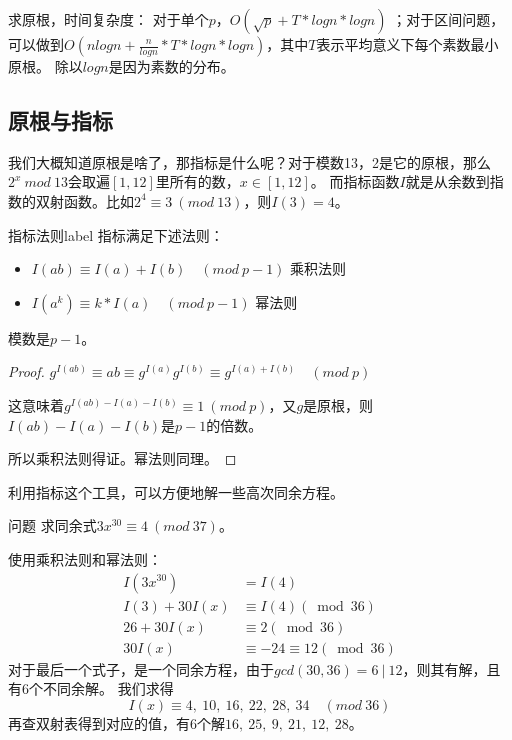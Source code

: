 \vbox{}

{\heiti 求原根，时间复杂度： 对于单个$p$，$O(\sqrt{p} + T*logn*logn)$   ；对于区间问题，可以做到$O(nlogn + \frac{n}{logn}*T*logn*logn)$，其中$T$表示平均意义下每个素数最小原根。
除以$logn$是因为素数的分布。}


\subsection{原根与指标}
我们大概知道原根是啥了，那指标是什么呢？对于模数13，2是它的原根，那么$2^x\ mod \ 13$会取遍$[1,12]$里所有的数，$x\in [1,12]$。
{\heiti 而指标函数$I$就是从余数到指数的双射函数。}比如$2^4\equiv 3\ (mod\ 13)$，则$I(3) = 4$。



\begin{theorem}{指标法则}{label}
	指标满足下述法则：
		\begin{itemize}
			\item $I(ab)\equiv I(a)+I(b) \quad (mod \ p-1)$ \quad  乘积法则
			\item $I(a^k)\equiv k*I(a)  \quad (mod \ p-1)$ \quad  幂法则
		\end{itemize}
\end{theorem}

\begin{note}
	模数是$p-1$。
\end{note}

\vbox{}

\begin{proof}
	 $g^{I(ab)}\equiv ab\equiv g^{I(a)}g^{I(b)}\equiv g^{I(a)+I(b)}\quad (mod \ p)$
	
	这意味着$g^{I(ab)-I(a)-I(b)}\equiv 1\ (mod \ p)$，又$g$是原根，则$I(ab)-I(a)-I(b)$是$p-1$的倍数。
	
	所以乘积法则得证。幂法则同理。
\end{proof}

\vbox{}

利用指标这个工具，可以方便地解一些高次同余方程。

\begin{custom}{问题}
求同余式$3x^{30}\equiv 4\ (mod \ 37)$。
\end{custom}

\begin{solution}
	使用乘积法则和幂法则：
$$
\begin{aligned} I\left(3 x^{30}\right) &=I(4) \\ I(3)+30 I(x) & \equiv I(4)(\bmod 36) \\ 26+30 I(x) &\equiv2(\bmod 36) \\ 30 I(x) & \equiv-24\equiv12(\bmod 36) \end{aligned}
$$
对于最后一个式子，是一个同余方程，由于$gcd(30,36)=6\ |\ 12$，则其有解，且有6个不同余解。
我们求得
$$
I(x)\equiv 4,\ 10,\ 16,\ 22,\ 28,\ 34 \quad (mod \ 36)
$$
再查双射表得到对应的值，有6个解$16,\ 25,\ 9,\ 21,\ 12,\ 28$。
\end{solution}


